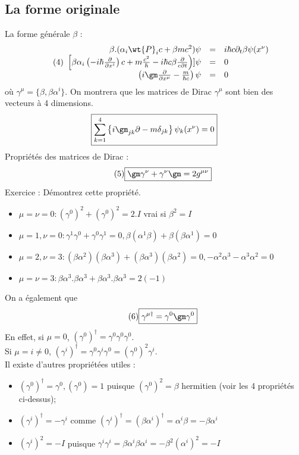 \subsection{La forme originale}
La forme générale $\beta$ :
\[\tag{4}\begin{array}{ r c l }
\beta.(\alpha_i\wt{P}_ic+\beta mc^2)\psi & = & i\hbar c\partial_t\beta\psi(x^\nu) \\
\left[\beta\alpha_i\left(-i\hbar\frac{\partial}{\partial x^i}\right)c+m\frac{c^2}{\hbar}
-i\hbar c\beta\frac{\partial}{c\partial t}\right)]\psi & = & 0 \\
 \left(i\gm\frac{\partial}{\partial x^\mu}-\frac{m}{\hbar c}\right)\psi & = & 0 \\
\end{array}\]
où $\gamma^{\mu} = \{ \beta, \beta \alpha^i \}$. On montrera que les matrices
de Dirac $\gamma^{\mu}$ sont bien des vecteurs à 4 dimensions.
\[\boxed{\sum_{k=1}^4\left\{
i\gm_{jk}\partial-m\delta_{jk}
\right\}\psi_k(x^\nu)=0}\]
Propriétés des matrices de Dirac :
\[
\tag{5} \boxed{\gm\gamma^\nu+\gamma^\nu\gm = 2g^{\mu\nu}}
\]
Exercice : Démontrez cette propriété.
\begin{itemize}
 \item $\mu=\nu=0:(\gamma^0)^2+(\gamma^0)^2=2.I$ vrai si $\beta^2=I$
 \item $\mu=1,\nu=0:\gamma^1\gamma^0+\gamma^0\gamma^1=0,
  \beta(\alpha^1\beta)+\beta(\beta\alpha^1)=0$
 \item $\mu=2,\nu=3:(\beta\alpha^2)(\beta\alpha^3)+(\beta\alpha^3)(\beta\alpha^2)=
  0, -\alpha^2\alpha^3-\alpha^3\alpha^2=0$
 \item $\mu=\nu=3:\beta\alpha^3.\beta\alpha^3+\beta\alpha^3.\beta\alpha^3=2(-1)$
\end{itemize}
On a également que
\[
\tag{6} \boxed{\gamma^{\mu\dagger} = \gamma^0\gm\gamma^0}
\]
En effet, si $\mu=0$, $(\gamma^0)^\dagger=\gamma^0\gamma^0\gamma^0$.\\
Si $\mu=i\neq 0$, $(\gamma^i)^\dagger=\gamma^0\gamma^i\gamma^0=(\gamma^0)^2\gamma^i$.\\

Il existe d'autres propriétées utiles :
\begin{itemize}
 \item $(\gamma^0)^\dagger=\gamma^0,(\gamma^0)=1$ puisque $(\gamma^0)^2=\beta$
  hermitien (voir les 4 propriétés ci-dessus);
 \item $(\gamma^i)^\dagger=-\gamma^i$ comme $(\gamma^i)^\dagger=
  (\beta\alpha^i)^\dagger=\alpha^i\beta=-\beta\alpha^i$
 \item $(\gamma^i)^2=-I$ puisque $\gamma^i\gamma^i=\beta\alpha^i\beta\alpha^i=
  -\beta^2(\alpha^i)^2=-I$
\end{itemize}
